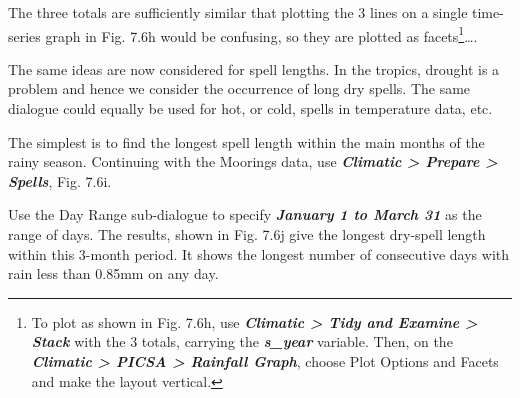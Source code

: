 \documentclass[
  letterpaper,
  DIV=11,
  numbers=noendperiod]{scrreprt}
\begin{document}
The three totals are sufficiently similar that plotting the 3 lines on a
single time-series graph in Fig. 7.6h would be confusing, so they are
plotted as facets\footnote{To plot as shown in Fig. 7.6h, use
  \textbf{\emph{Climatic \textgreater{} Tidy and Examine \textgreater{}
  Stack}} with the 3 totals, carrying the \textbf{\emph{s\_year}}
  variable. Then, on the \textbf{\emph{Climatic \textgreater{} PICSA
  \textgreater{} Rainfall Graph}}, choose Plot Options and Facets and
  make the layout vertical.}\ldots.

The same ideas are now considered for spell lengths. In the tropics,
drought is a problem and hence we consider the occurrence of long dry
spells. The same dialogue could equally be used for hot, or cold, spells
in temperature data, etc.

The simplest is to find the longest spell length within the main months
of the rainy season. Continuing with the Moorings data, use
\textbf{\emph{Climatic \textgreater{} Prepare \textgreater{} Spells}},
Fig. 7.6i.

Use the Day Range sub-dialogue to specify \textbf{\emph{January 1 to
March 31}} as the range of days. The results, shown in Fig. 7.6j give
the longest dry-spell length within this 3-month period. It shows the
longest number of consecutive days with rain less than 0.85mm on any
day.
\end{document}
